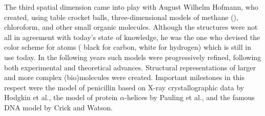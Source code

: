 The third spatial dimension came into play with August Wilhelm Hofmann, who created, using table crocket balls, three-dimensional
models of methane (), chloroform, and other small organic molecules.\cite{HO04.13}
Although the structures were not all in agreement with today's state of knowledge,
he 
was the one who devised the color scheme for atoms (\eg{} black for carbon, white for hydrogen)
which is still in use today. 
In the following years such models were progressively refined, following both experimental
and theoretical advances. Structural representations
of larger and more complex (bio)molecules were created.
Important milestones in this respect were the model of penicillin based on X-ray 
crystallographic data by Hodgkin et al.\cite{CR49.1},
%
the model of protein $\alpha$-helices by Pauling et al.\cite{PA51.2},%
and the famous DNA model by Crick and Watson.\cite{CR54.1}%

\newcommand{\subgraphpngint}[3]{
  \begin{minipage}[t]{2em}\subcaption{}\label{#1}\end{minipage}%
  \begin{minipage}[t]{\dimexpr#3\linewidth\relax}
  \centering
  \hfill \\
  \texttt{[image: \\path/fig/\#2]}
  \end{minipage}%
}

